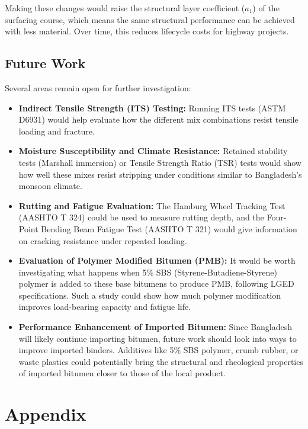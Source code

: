 \documentclass[12pt,a4paper]{article}
\begin{document}
Making these changes would raise the structural layer coefficient ($a_1$) of the surfacing course, which means the same structural performance can be achieved with less material. Over time, this reduces lifecycle costs for highway projects.

\subsection{Future Work}
Several areas remain open for further investigation:
\begin{itemize}
    \item \textbf{Indirect Tensile Strength (ITS) Testing:} Running ITS tests (ASTM D6931) would help evaluate how the different mix combinations resist tensile loading and fracture.
    \item \textbf{Moisture Susceptibility and Climate Resistance:} Retained stability tests (Marshall immersion) or Tensile Strength Ratio (TSR) tests would show how well these mixes resist stripping under conditions similar to Bangladesh's monsoon climate.
    \item \textbf{Rutting and Fatigue Evaluation:} The Hamburg Wheel Tracking Test (AASHTO T 324) could be used to measure rutting depth, and the Four-Point Bending Beam Fatigue Test (AASHTO T 321) would give information on cracking resistance under repeated loading.
    \item \textbf{Evaluation of Polymer Modified Bitumen (PMB):} It would be worth investigating what happens when 5\% SBS (Styrene-Butadiene-Styrene) polymer is added to these base bitumens to produce PMB, following LGED specifications. Such a study could show how much polymer modification improves load-bearing capacity and fatigue life.
    \item \textbf{Performance Enhancement of Imported Bitumen:} Since Bangladesh will likely continue importing bitumen, future work should look into ways to improve imported binders. Additives like 5\% SBS polymer, crumb rubber, or waste plastics could potentially bring the structural and rheological properties of imported bitumen closer to those of the local product.
\end{itemize}

\clearpage
{}
{}



\clearpage
\section{Appendix}
\end{document}
